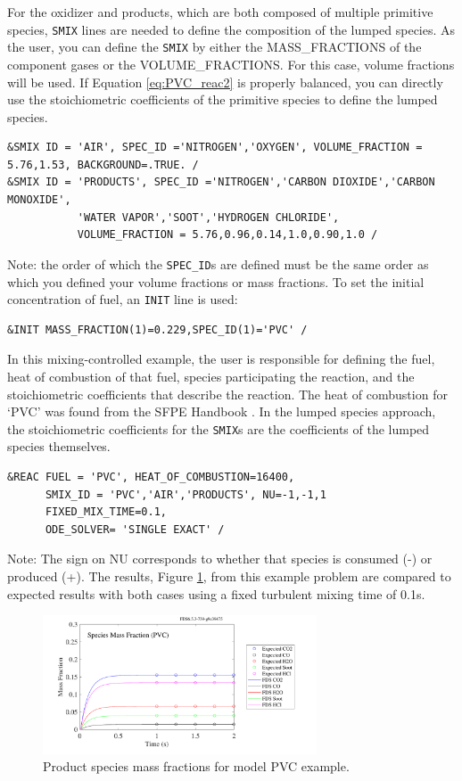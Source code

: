 \documentclass[11pt]{book}
\newcommand{\ct}{\tt\small}
\begin{document}
For the oxidizer and products, which are both composed of multiple primitive species, {\ct SMIX} lines are needed to define the composition of the lumped species. As the user, you can define the {\ct SMIX} by either the MASS\_FRACTIONS of the component gases or the VOLUME\_FRACTIONS. For this case, volume fractions will be used. If Equation \ref{eq:PVC_reac2} is properly balanced, you can directly use the stoichiometric coefficients of the primitive species to define the lumped species.
\footnotesize
\begin{verbatim}
&SMIX ID = 'AIR', SPEC_ID ='NITROGEN','OXYGEN', VOLUME_FRACTION = 5.76,1.53, BACKGROUND=.TRUE. /
&SMIX ID = 'PRODUCTS', SPEC_ID ='NITROGEN','CARBON DIOXIDE','CARBON MONOXIDE',
           'WATER VAPOR','SOOT','HYDROGEN CHLORIDE',
           VOLUME_FRACTION = 5.76,0.96,0.14,1.0,0.90,1.0 /
\end{verbatim} \normalsize
Note: the order of which the {\ct SPEC\_ID}s are defined must be the same order as which you defined your volume fractions or mass fractions. To set the initial concentration of fuel, an {\ct INIT} line is used:
\footnotesize
\begin{verbatim}
&INIT MASS_FRACTION(1)=0.229,SPEC_ID(1)='PVC' /
\end{verbatim} \normalsize

In this mixing-controlled example, the user is responsible for defining the fuel, heat of combustion of that fuel, species participating the reaction, and the stoichiometric coefficients that describe the reaction. The heat of combustion for `PVC' was found from the SFPE Handbook \cite{SFPE:Tewarson}. In the lumped species approach, the stoichiometric coefficients for the {\ct SMIX}s are the coefficients of the lumped species themselves.
\footnotesize
\begin{verbatim}
&REAC FUEL = 'PVC', HEAT_OF_COMBUSTION=16400,
      SMIX_ID = 'PVC','AIR','PRODUCTS', NU=-1,-1,1
      FIXED_MIX_TIME=0.1,
      ODE_SOLVER= 'SINGLE EXACT' /
\end{verbatim} \normalsize
Note: The sign on NU corresponds to whether that species is consumed (-) or produced (+). The results, Figure \ref{pvc_combustion}, from this example problem are compared to expected results with both cases using a fixed turbulent mixing time of 0.1s.


\begin{figure}[ht]
\centering \includegraphics[width=3.2in]{SCRIPT_FIGURES/PVC_Combustion_Spec}
\caption{Product species mass fractions for model PVC example.}
\label{pvc_combustion}
\end{figure}
\end{document}
